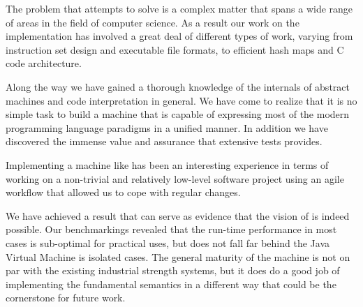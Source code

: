 The problem that \thename{} attempts to solve is a complex matter that spans a
wide range of areas in the field of computer science. As a result our work on
the implementation has involved a great deal of different types of work, varying
from instruction set design and executable file formats, to efficient hash maps
and C code architecture.

Along the way we have gained a thorough knowledge of the internals of abstract
machines and code interpretation in general. We have come to realize that it is
no simple task to build a machine that is capable of expressing most of the
modern programming language paradigms in a unified manner. In addition we have
discovered the immense value and assurance that extensive tests provides.

Implementing a machine like \thename{} has been an interesting experience in
terms of working on a non-trivial and relatively low-level software project
using an agile workflow that allowed us to cope with regular changes.

We have achieved a result that can serve as evidence that the vision of
\thename{} is indeed possible. Our benchmarkings revealed that the run-time
performance in most cases is sub-optimal for practical uses, but does not fall
far behind the Java Virtual Machine is isolated cases. The general maturity of
the machine is not on par with the existing industrial strength systems, but it
does do a good job of implementing the fundamental semantics in a different way
that could be the cornerstone for future work.

